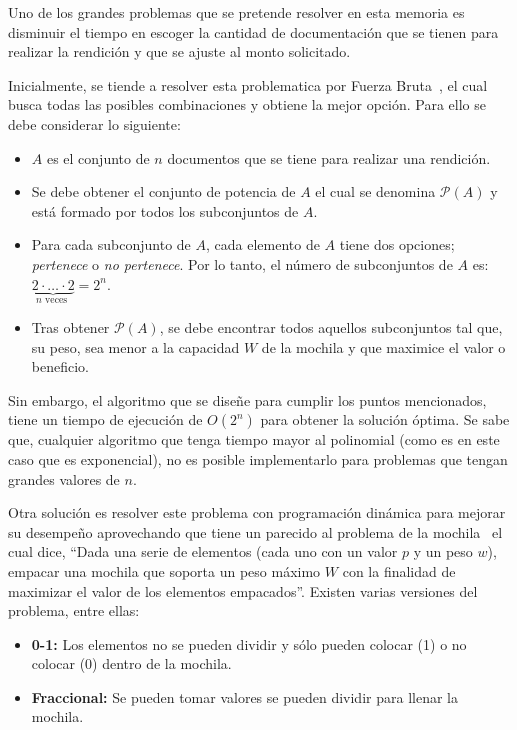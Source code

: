 Uno de los grandes problemas que se pretende resolver en esta memoria es disminuir el tiempo en escoger la cantidad de documentación que se tienen para realizar la rendición y que se ajuste al monto solicitado.

Inicialmente, se tiende a resolver esta problematica por Fuerza Bruta~\cite{22}, el cual busca todas las posibles combinaciones y obtiene la mejor opción. Para ello se debe considerar lo siguiente:

\begin{itemize}
    \item $A$ es el conjunto de $n$ documentos que se tiene para realizar una rendición.
    \item Se debe obtener el conjunto de potencia de $A$ el cual se denomina $\mathcal{P}(A)$ y está formado por todos los subconjuntos de $A$.
    \item Para cada subconjunto de $A$, cada elemento de $A$ tiene dos opciones; \textit{pertenece} o \textit{no pertenece}. Por lo tanto, el número de subconjuntos de $A$ es: $\underbrace{2\cdot \ldots \cdot 2}_{n\mbox{ veces }}=2^n$.
    \item Tras obtener $\mathcal{P}(A)$, se debe encontrar todos aquellos subconjuntos tal que, su peso, sea menor a la capacidad $W$ de la mochila y que maximice el valor o beneficio.
\end{itemize}

Sin embargo, el algoritmo que se diseñe para cumplir los puntos mencionados, tiene un tiempo de ejecución de $O(2^n)$ para obtener la solución óptima. Se sabe que, cualquier algoritmo que tenga tiempo mayor al polinomial (como es en este caso que es exponencial), no es posible implementarlo para problemas que tengan grandes valores de $n$.

Otra solución es resolver este problema con programación dinámica para mejorar su desempeño aprovechando que tiene un parecido al problema de la mochila~\cite{22} el cual dice, “Dada una serie de elementos (cada uno con un valor $p$ y un peso $w$), empacar una mochila que soporta un peso máximo $W$ con la finalidad de maximizar el valor de los elementos empacados”. Existen varias versiones del problema, entre ellas:

\begin{itemize}
    \item \textbf{0-1:} Los elementos no se pueden dividir y sólo pueden colocar (1) o no colocar (0) dentro de la mochila.
    \item \textbf{Fraccional:} Se pueden tomar valores se pueden dividir para llenar la mochila.
\end{itemize}

